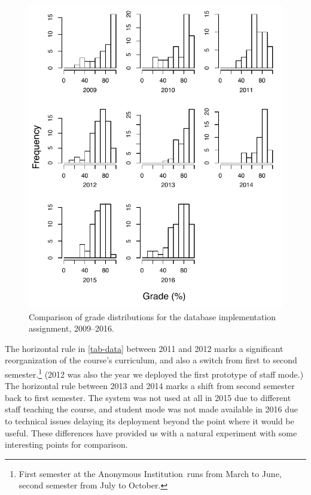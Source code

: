 \documentclass[sigconf, review, anonymous, capitalise]{acmart}
\newcommand{\anoninstitution}{Anonymous Institution}
\begin{document}
\begin{figure}
    \includegraphics[width=\columnwidth,keepaspectratio]{grades_all_years.pdf}
    \caption{Comparison of grade distributions for the database implementation assignment, 2009--2016.}
    \label{fig-distributions}
\end{figure}


The horizontal rule in \cref{tab-data} between 2011 and 2012 marks a significant reorganization of the course's curriculum, and also a switch from first to second semester.\footnote{First semester at the \anoninstitution\ runs from March to June, second semester from July to October.} (2012 was also the year we deployed the first prototype of staff mode.) The horizontal rule between 2013 and 2014 marks a shift from second semester back to first semester. The system was not used at all in 2015 due to different staff teaching the course, and student mode was not made available in 2016 due to technical issues delaying its deployment beyond the point where it would be useful. These differences have provided us with a natural experiment with some interesting points for comparison.
\end{document}
